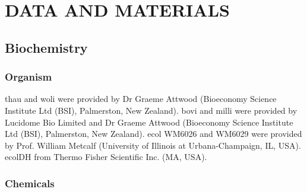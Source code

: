 \section{DATA AND MATERIALS}
\label{sec:data_and_materials}




\subsection{Biochemistry} %
\label{sec:data_and_materials_bch}

\subsubsection{Organism}

\acrlong{thau} and \acrlong{woli} were provided by Dr Graeme Attwood (Bioeconomy Science Institute Ltd (BSI), Palmerston, New Zealand).  \acrlong{bovi} and \acrlong{milli} were provided by Lucidome Bio Limited and Dr Graeme Attwood (Bioeconomy Science Institute Ltd (BSI), Palmerston, New Zealand). \acrlong{ecol} WM6026 and WM6029 were provided by Prof. William Metcalf (University of Illinois at Urbana-Champaign, IL, USA). \acrlong{ecolDH} from Thermo Fisher Scientific Inc. (MA, USA).

\subsubsection{Chemicals}
\label{sec:chemicals}

